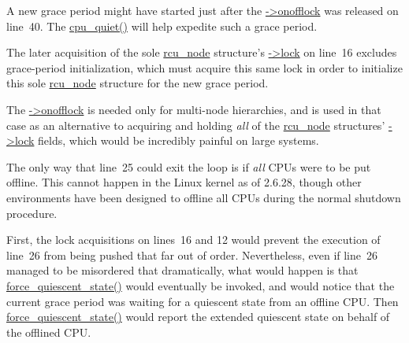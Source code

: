 	A new grace period might have started just after the
	\url{->onofflock} was released on line~40.
	The \url{cpu_quiet()} will help expedite such a grace period.


	The later acquisition of the sole \url{rcu_node} structure's
	\url{->lock} on line~16 excludes grace-period initialization,
	which must acquire this same lock in order to initialize this
	sole \url{rcu_node} structure for the new grace period.

	The \url{->onofflock} is needed only for multi-node hierarchies,
	and is used in that case as an alternative to acquiring and
	holding \emph{all} of the \url{rcu_node} structures'
	\url{->lock} fields, which would be incredibly painful on
	large systems.


	The only way that line~25 could exit the loop is if \emph{all}
	CPUs were to be put offline.
	This cannot happen in the Linux kernel as of 2.6.28, though
	other environments have been designed to offline all CPUs
	during the normal shutdown procedure.


	First, the lock acquisitions on lines~16 and 12 would prevent
	the execution of line~26 from being pushed that far out of
	order.
	Nevertheless, even if line~26 managed to be misordered that
	dramatically, what would happen is that \url{force_quiescent_state()}
	would eventually be invoked, and would notice that the current
	grace period was waiting for a quiescent state from an offline
	CPU.
	Then \url{force_quiescent_state()} would report the extended
	quiescent state on behalf of the offlined CPU.


